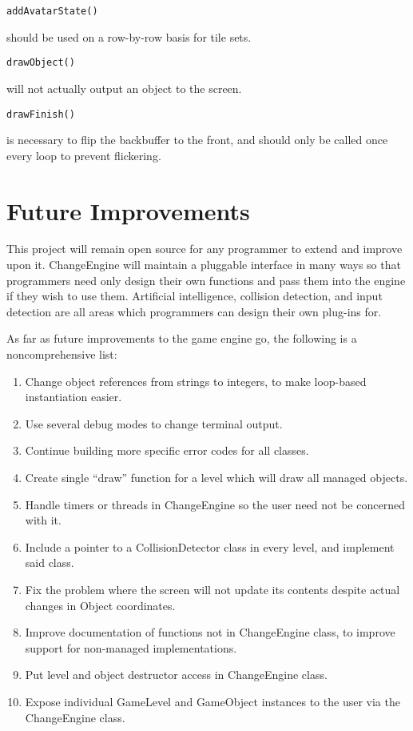 \documentclass[12pt]{article}
\begin{document}
\begin{verbatim}addAvatarState()\end{verbatim} should be used on a row-by-row basis for tile sets.
\\

\begin{verbatim}drawObject()\end{verbatim} will not actually output an object to the screen.
\\

\begin{verbatim}drawFinish()\end{verbatim} is necessary to flip the backbuffer to the front, and should only be called once every loop to prevent flickering.

  \section{Future Improvements}
    This project will remain open source for any programmer to extend and improve upon it. ChangeEngine will maintain a pluggable interface in many ways so that programmers need only design their own functions and pass them into the engine if they wish to use them. Artificial intelligence, collision detection, and input detection are all areas which programmers can design their own plug-ins for.

As far as future improvements to the game engine go, the following is a noncomprehensive list:

\begin{enumerate}
 \item Change object references from strings to integers, to make loop-based instantiation easier.
 \item Use several debug modes to change terminal output.
 \item Continue building more specific error codes for all classes.
 \item Create single ``draw'' function for a level which will draw all managed objects.
 \item Handle timers or threads in ChangeEngine so the user need not be concerned with it.
 \item Include a pointer to a CollisionDetector class in every level, and implement said class.
 \item Fix the problem where the screen will not update its contents despite actual changes in Object coordinates.
 \item Improve documentation of functions not in ChangeEngine class, to improve support for non-managed implementations.
 \item Put level and object destructor access in ChangeEngine class.
 \item Expose individual GameLevel and GameObject instances to the user via the ChangeEngine class.
\end{enumerate}
\end{document}

